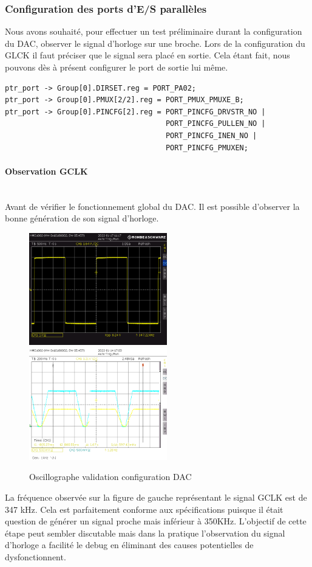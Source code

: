 \documentclass[a4paper]{article}
\begin{document}
\subsubsection{Configuration des ports d’E/S parallèles}
Nous avons souhaité, pour effectuer un test préliminaire durant la configuration du DAC, observer le signal d'horloge sur une broche. Lors de la configuration du GLCK il faut préciser que le signal sera placé en sortie. Cela étant fait, nous pouvons dès à présent configurer le port de sortie lui même.
\begin{lstlisting}[style=CStyle]
ptr_port -> Group[0].DIRSET.reg = PORT_PA02;
ptr_port -> Group[0].PMUX[2/2].reg = PORT_PMUX_PMUXE_B;
ptr_port -> Group[0].PINCFG[2].reg = PORT_PINCFG_DRVSTR_NO |
                                     PORT_PINCFG_PULLEN_NO |
                                     PORT_PINCFG_INEN_NO |
                                     PORT_PINCFG_PMUXEN;
\end{lstlisting}
\paragraph{Observation GCLK} ~~\\
Avant de vérifier le fonctionnement global du DAC. Il est possible d'observer la bonne génération de son signal d'horloge.
\begin{figure}[H]
	\centering
	\includegraphics[width=6cm]{347}
	\includegraphics[width=6cm]{gab}
	\caption{Oscillographe validation configuration DAC}
\end{figure}
La fréquence observée sur la figure de gauche représentant le signal GCLK est de 347 kHz. Cela est parfaitement conforme aux spécifications puisque il était question de générer un signal proche mais inférieur à 350KHz. L'objectif de cette étape peut sembler discutable mais dans la pratique l'observation du signal d'horloge a facilité le debug en éliminant des causes potentielles de dysfonctionnent.
  
\end{document}
